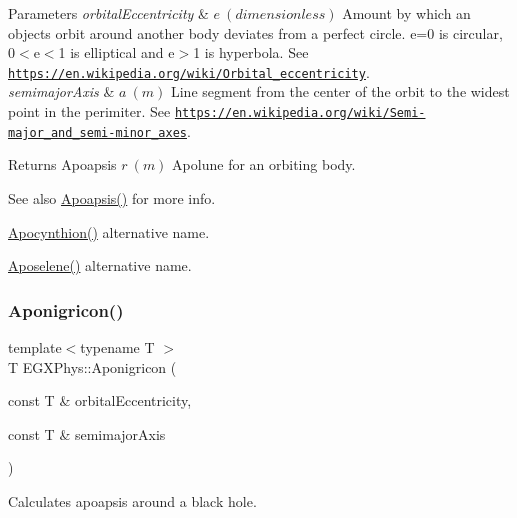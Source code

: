 \begin{DoxyParams}{Parameters}
{\em orbital\+Eccentricity} & $ e\ (dimensionless)$ Amount by which an objects orbit around another body deviates from a perfect circle. e=0 is circular, 0$<$e$<$1 is elliptical and e$>$1 is hyperbola. See \href{https://en.wikipedia.org/wiki/Orbital_eccentricity}{\tt https\+://en.\+wikipedia.\+org/wiki/\+Orbital\+\_\+eccentricity}. \\
\hline
{\em semimajor\+Axis} & $ a\ (m)$ Line segment from the center of the orbit to the widest point in the perimiter. See \href{https://en.wikipedia.org/wiki/Semi-major_and_semi-minor_axes}{\tt https\+://en.\+wikipedia.\+org/wiki/\+Semi-\/major\+\_\+and\+\_\+semi-\/minor\+\_\+axes}. \\
\hline
\end{DoxyParams}
\begin{DoxyReturn}{Returns}
Apoapsis $ r\ (m)$ Apolune for an orbiting body. 
\end{DoxyReturn}
\begin{DoxySeeAlso}{See also}
\mbox{\hyperlink{group___e_g_x_phys-_apoapsis_gaf962e650bf84a568458e8eb39b1c61ba}{Apoapsis()}} for more info. 

\mbox{\hyperlink{group___e_g_x_phys-_apoapsis_ga557bb4d1a0ce7f17aaa8f8de469d4f52}{Apocynthion()}} alternative name. 

\mbox{\hyperlink{group___e_g_x_phys-_apoapsis_gab61f3b2d6a5be3f62f5fb6dfdf802014}{Aposelene()}} alternative name. 
\end{DoxySeeAlso}
\mbox{\label{group___e_g_x_phys-_apoapsis_ga83e866e2f887ff8eafbc3971d4cab8be}} 
\subsubsection{\texorpdfstring{Aponigricon()}{Aponigricon()}}
{\footnotesize\ttfamily template$<$typename T $>$ \\
T E\+G\+X\+Phys\+::\+Aponigricon (\begin{DoxyParamCaption}\item[{const T \&}]{orbital\+Eccentricity,  }\item[{const T \&}]{semimajor\+Axis }\end{DoxyParamCaption})}



Calculates apoapsis around a black hole. 


